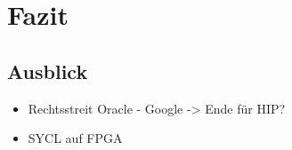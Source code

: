 \section{Fazit}
\label{fazit}

\subsection{Ausblick}
\label{fazit:ausblick}

\begin{itemize}
    \item Rechtsstreit Oracle - Google -> Ende für HIP?
    \item SYCL auf FPGA
\end{itemize}
